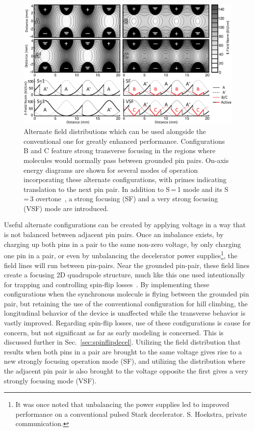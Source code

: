 \begin{figure}[t!]
\includegraphics[width=\linewidth]{Slowing/pinpairformal.png}%
\caption[Definition and Explanation of Alternate Field Distributions]{\label{fig:chargecartoon}
Alternate field distributions which can be used alongside the conventional one for greatly enhanced performance. Configurations B and C feature strong transverse focusing in the regions where molecules would normally pass between grounded pin pairs. On-axis energy diagrams are shown for several modes of operation incorporating these alternate configurations, with primes indicating translation to the next pin pair. In addition to S\,=\,1 mode and its S\,=\,3 overtone~\cite{VanDeMeerakker2005a}, a strong focusing (SF) and a very strong focusing (VSF) mode are introduced.
}
\end{figure}


Useful alternate configurations can be created by applying voltage in a way that is not balanced between adjacent pin pairs. 
Once an imbalance exists, by charging up both pins in a pair to the same non-zero voltage, by only charging one pin in a pair, or even by unbalancing the decelerator power supplies\footnote{It was once noted that unbalancing the power supplies led to improved performance on a conventional pulsed Stark decelerator. S. Hoekstra, private communication.}, the field lines will run between pin-pairs. 
Near the grounded pin-pair, these field lines create a focusing 2D quadrupole structure, much like this one used intentionally for trapping and controlling spin-flip losses~\cite{Reens2017}. 
By implementing these configurations when the synchronous molecule is flying between the grounded pin pair, but retaining the use of the conventional configuration for hill climbing, the longitudinal behavior of the device is unaffected while the transverse behavior is vastly improved.
Regarding spin-flip losses, use of these configurations is cause for concern, but not significant as far as early modeling is concerned. This is discussed further in Sec.~\ref{sec:spinflipdecel}.
Utilizing the field distribution that results when both pins in a pair are brought to the same voltage gives rise to a new strongly focusing operation mode (SF), and utilizing the distribution where the adjacent pin pair is also brought to the voltage opposite the first gives a very strongly focusing mode (VSF). 

